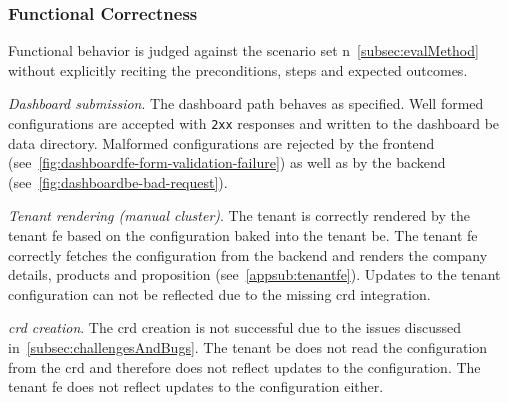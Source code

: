 \documentclass[11pt, a4paper, oneside, listof=totoc]{scrartcl}
\begin{document}
            \subsubsection{Functional Correctness}\label{subsubsec:functionalCorrectness}
                Functional behavior is judged against the scenario set 
                n~\autoref{subsec:evalMethod} without explicitly reciting the preconditions, steps
                and expected outcomes.
                \begin{enumerate}[label={[\arabic*]:},
                    ref=Challenge~\arabic*,
                    leftmargin=*,
                    itemsep=0.6\baselineskip]

                    \item\label{chal:fcdashboardSubmission}
                        \textit{Dashboard submission}.
                        The dashboard path behaves as specified. Well formed configurations are
                        accepted with \texttt{2xx} responses and written to the dashboard \gls{be}
                        data directory.
                        Malformed configurations are rejected by the frontend
                        (see~\autoref{fig:dashboardfe-form-validation-failure}) as well as by the
                        backend (see~\autoref{fig:dashboardbe-bad-request}).

                    \item\label{chal:fctenantRendering}
                        \textit{Tenant rendering (manual cluster)}.
                        The tenant is correctly rendered by the tenant \gls{fe} based on the
                        configuration baked into the tenant \gls{be}.
                        The tenant \gls{fe} correctly fetches the configuration from the backend
                        and renders the company details, products and proposition
                        (see~\autoref{appsub:tenantfe}).
                        Updates to the tenant configuration can not be reflected due to the missing
                        \gls{crd} integration.

                    \item\label{chal:fcCRD}
                        \textit{\gls{crd} creation}.
                        The \gls{crd} creation is not successful due to the issues discussed
                        in~\autoref{subsec:challengesAndBugs}.
                        The tenant \gls{be} does not read the configuration from the \gls{crd} and
                        therefore does not reflect updates to the configuration.
                        The tenant \gls{fe} does not reflect updates to the configuration either.
            \end{enumerate}
                
\end{document}
